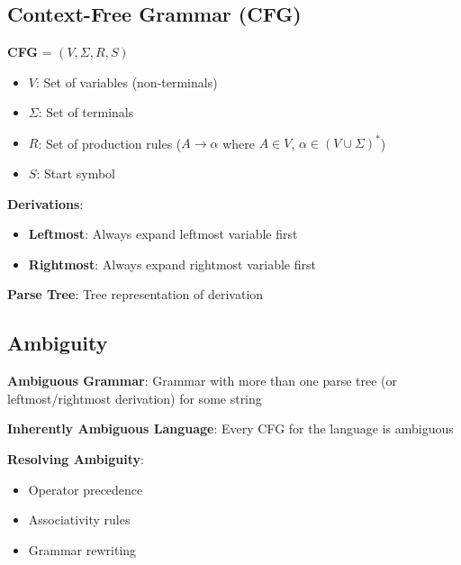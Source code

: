 \documentclass[12pt,a4paper]{report}
\begin{document}
\subsection{Context-Free Grammar (CFG)}
\begin{concept}
\textbf{CFG} = $(V, \Sigma, R, S)$
\begin{itemize}
    \item $V$: Set of variables (non-terminals)
    \item $\Sigma$: Set of terminals
    \item $R$: Set of production rules ($A \to \alpha$ where $A \in V$, $\alpha \in (V \cup \Sigma)^*$)
    \item $S$: Start symbol
\end{itemize}

\textbf{Derivations}:
\begin{itemize}
    \item \textbf{Leftmost}: Always expand leftmost variable first
    \item \textbf{Rightmost}: Always expand rightmost variable first
\end{itemize}

\textbf{Parse Tree}: Tree representation of derivation
\end{concept}

\subsection{Ambiguity}
\begin{concept}
\textbf{Ambiguous Grammar}: Grammar with more than one parse tree (or leftmost/rightmost derivation) for some string

\textbf{Inherently Ambiguous Language}: Every CFG for the language is ambiguous

\textbf{Resolving Ambiguity}:
\begin{itemize}
    \item Operator precedence
    \item Associativity rules
    \item Grammar rewriting
\end{itemize}
\end{concept}
\end{document}

